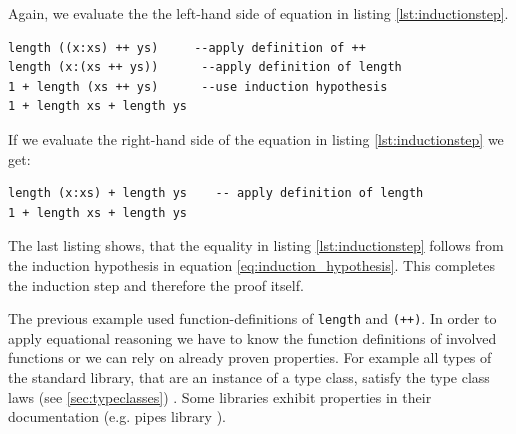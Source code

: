 \begin{description}
Again, we evaluate the the left-hand side of equation in listing \ref{lst:inductionstep}.

\begin{program}
\begin{verbatim}
length ((x:xs) ++ ys)     --apply definition of ++
length (x:(xs ++ ys))      --apply definition of length
1 + length (xs ++ ys)      --use induction hypothesis
1 + length xs + length ys
\end{verbatim}
\end{program}

If we evaluate the right-hand side of the equation in listing \ref{lst:inductionstep} we get:
\begin{program}
\begin{verbatim}
length (x:xs) + length ys    -- apply definition of length
1 + length xs + length ys
\end{verbatim}
\end{program}

The last listing shows, that the equality in listing \ref{lst:inductionstep} follows from the induction hypothesis in equation \ref{eq:induction_hypothesis}. This completes the induction step and therefore the proof itself.
\end{description}

The previous example used \glspl{function-definition} of \verb|length| and \verb|(++)|. In order to apply equational reasoning we have to know the function definitions of involved functions or we can rely on already proven properties. 
For example all types of the standard library, that are an instance of a type class, satisfy the type class laws (see \ref{sec:typeclasses}) \cite{yorgey}. Some libraries exhibit properties in their documentation (e.g. pipes library \cite{gonzales13}). 